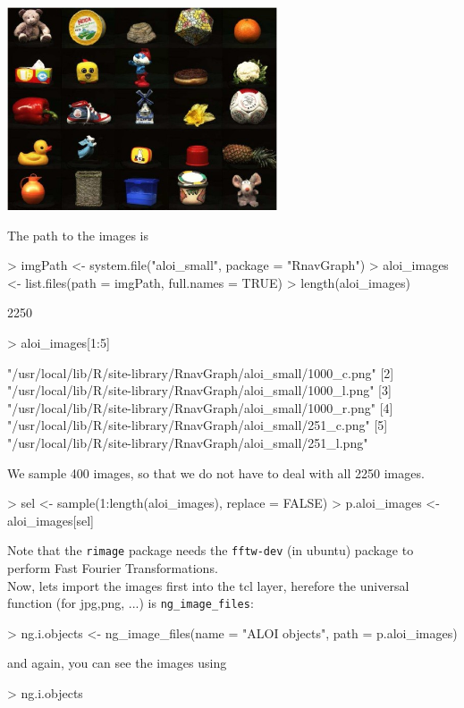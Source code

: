 \documentclass[12pt,oneside,titlepage,letter]{article}
\newcommand{\modify}[1]{{\color{blue}#1}}
\begin{document}
\begin{center}
  \includegraphics[width = 0.6\textwidth]{img/aloi.jpg}
\end{center}

The path to the images is
\begin{Schunk}
\begin{Sinput}
> imgPath <- system.file("aloi_small", package = "RnavGraph")
> aloi_images <- list.files(path = imgPath, full.names = TRUE)
> length(aloi_images)
\end{Sinput}
\begin{Soutput}
[1] 2250
\end{Soutput}
\begin{Sinput}
> aloi_images[1:5]
\end{Sinput}
\begin{Soutput}
[1] "/usr/local/lib/R/site-library/RnavGraph/aloi_small/1000_c.png"
[2] "/usr/local/lib/R/site-library/RnavGraph/aloi_small/1000_l.png"
[3] "/usr/local/lib/R/site-library/RnavGraph/aloi_small/1000_r.png"
[4] "/usr/local/lib/R/site-library/RnavGraph/aloi_small/251_c.png" 
[5] "/usr/local/lib/R/site-library/RnavGraph/aloi_small/251_l.png" 
\end{Soutput}
\end{Schunk}
We sample 400 images, so that we do not have to deal with all 2250 images.
\begin{Schunk}
\begin{Sinput}
> sel <- sample(1:length(aloi_images), replace = FALSE)
> p.aloi_images <- aloi_images[sel]
\end{Sinput}
\end{Schunk}


\modify{Note that the \texttt{rimage} package needs the \texttt{fftw-dev} (in ubuntu) package to perform Fast Fourier Transformations.}\\


Now, lets import the images first into the tcl layer, herefore the \modify{universal function (for jpg,png, ...)} is \texttt{ng\_image\_files}:
\begin{Schunk}
\begin{Sinput}
> ng.i.objects <- ng_image_files(name = "ALOI objects", path = p.aloi_images)
\end{Sinput}
\end{Schunk}
and again, you can see the images using
\begin{Schunk}
\begin{Sinput}
> ng.i.objects
\end{Sinput}
\end{Schunk}
\end{document}

